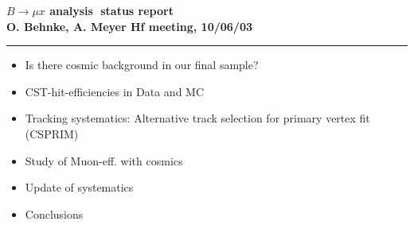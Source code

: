 \begin{slide}
\pagestyle{headings}
\sf
\begin{center}
\vspace{2cm}
\huge \bf 
\sf
\Huge \blue 
$B \rightarrow \mu x$ analysis 
$\; $status report\\[5mm]
%
\normalsize \black 
O. Behnke, A. Meyer 
\hspace{5mm} 
Hf meeting, 10/06/03
\end{center}
{\red \rule{\textwidth}{0.1\semcm}}
   \LARGE \sf \blue
\vspace{-0.3cm}
\begin{itemize}
\item Is there cosmic background in our final sample?
\item CST-hit-efficiencies in Data and MC
\item Tracking systematics: Alternative track selection for primary
      vertex fit (CSPRIM)
\item 
\red Study of Muon-eff. with cosmics
\item Update of systematics
\item Conclusions
\end{itemize}
\end{slide}


